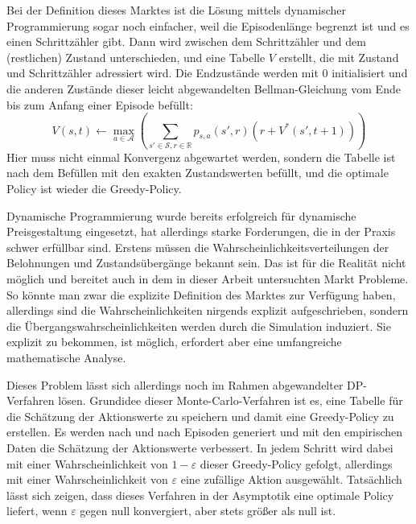 Bei der Definition dieses Marktes ist die Lösung mittels dynamischer Programmierung sogar noch einfacher, weil die Episodenlänge begrenzt ist und es einen Schrittzähler gibt.
Dann wird zwischen dem Schrittzähler und dem (restlichen) Zustand unterschieden, und eine Tabelle $V$ erstellt, die mit Zustand und Schrittzähler adressiert wird.
Die Endzustände werden mit $0$ initialisiert und die anderen Zustände dieser leicht abgewandelten Bellman-Gleichung vom Ende bis zum Anfang einer Episode befüllt:
\begin{equation}
	V(s, t) \leftarrow \max_{a\in\mathcal{A}}{\left(\sum_{s'\in\mathcal{S}, r \in \mathbb{R}}{p_{s, a}\left(s', r\right) \left(r + V^*(s', t + 1)\right)}\right)}
\end{equation}
Hier muss nicht einmal Konvergenz abgewartet werden, sondern die Tabelle ist nach dem Befüllen mit den exakten Zustandswerten befüllt, und die optimale Policy ist wieder die Greedy-Policy.

Dynamische Programmierung wurde bereits erfolgreich für dynamische Preisgestaltung eingesetzt, hat allerdings starke Forderungen, die in der Praxis schwer erfüllbar sind. \cite{10.1145/3219819.3219833}
Erstens müssen die Wahrscheinlichkeitsverteilungen der Belohnungen und Zustandsübergänge bekannt sein.
Das ist für die Realität nicht möglich und bereitet auch in dem in dieser Arbeit untersuchten Markt Probleme.
So könnte man zwar die explizite Definition des Marktes zur Verfügung haben, allerdings sind die Wahrscheinlichkeiten nirgends explizit aufgeschrieben, sondern die Übergangswahrscheinlichkeiten werden durch die Simulation induziert.
Sie explizit zu bekommen, ist möglich, erfordert aber eine umfangreiche mathematische Analyse.

Dieses Problem lässt sich allerdings noch im Rahmen abgewandelter DP-Verfahren lösen.
Grundidee dieser Monte-Carlo-Verfahren ist es, eine Tabelle für die Schätzung der Aktionswerte zu speichern und damit eine Greedy-Policy zu erstellen.
Es werden nach und nach Episoden generiert und mit den empirischen Daten die Schätzung der Aktionswerte verbessert.
In jedem Schritt wird dabei mit einer Wahrscheinlichkeit von $1-\varepsilon$ dieser Greedy-Policy gefolgt, allerdings mit einer Wahrscheinlichkeit von $\varepsilon$ eine zufällige Aktion ausgewählt.
Tatsächlich lässt sich zeigen, dass dieses Verfahren in der Asymptotik eine optimale Policy liefert, wenn $\varepsilon$ gegen null konvergiert, aber stets größer als null ist. \cite{Sutton1998}

